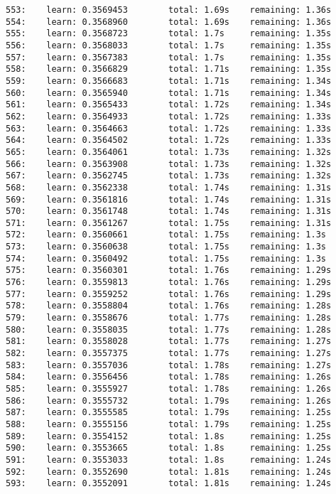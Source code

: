 \documentclass[11pt]{article}
\begin{document}
\begin{Verbatim}[commandchars=\\\{\}]
553:    learn: 0.3569453        total: 1.69s    remaining: 1.36s
554:    learn: 0.3568960        total: 1.69s    remaining: 1.36s
555:    learn: 0.3568723        total: 1.7s     remaining: 1.35s
556:    learn: 0.3568033        total: 1.7s     remaining: 1.35s
557:    learn: 0.3567383        total: 1.7s     remaining: 1.35s
558:    learn: 0.3566829        total: 1.71s    remaining: 1.35s
559:    learn: 0.3566683        total: 1.71s    remaining: 1.34s
560:    learn: 0.3565940        total: 1.71s    remaining: 1.34s
561:    learn: 0.3565433        total: 1.72s    remaining: 1.34s
562:    learn: 0.3564933        total: 1.72s    remaining: 1.33s
563:    learn: 0.3564663        total: 1.72s    remaining: 1.33s
564:    learn: 0.3564502        total: 1.72s    remaining: 1.33s
565:    learn: 0.3564061        total: 1.73s    remaining: 1.32s
566:    learn: 0.3563908        total: 1.73s    remaining: 1.32s
567:    learn: 0.3562745        total: 1.73s    remaining: 1.32s
568:    learn: 0.3562338        total: 1.74s    remaining: 1.31s
569:    learn: 0.3561816        total: 1.74s    remaining: 1.31s
570:    learn: 0.3561748        total: 1.74s    remaining: 1.31s
571:    learn: 0.3561267        total: 1.75s    remaining: 1.31s
572:    learn: 0.3560661        total: 1.75s    remaining: 1.3s
573:    learn: 0.3560638        total: 1.75s    remaining: 1.3s
574:    learn: 0.3560492        total: 1.75s    remaining: 1.3s
575:    learn: 0.3560301        total: 1.76s    remaining: 1.29s
576:    learn: 0.3559813        total: 1.76s    remaining: 1.29s
577:    learn: 0.3559252        total: 1.76s    remaining: 1.29s
578:    learn: 0.3558804        total: 1.76s    remaining: 1.28s
579:    learn: 0.3558676        total: 1.77s    remaining: 1.28s
580:    learn: 0.3558035        total: 1.77s    remaining: 1.28s
581:    learn: 0.3558028        total: 1.77s    remaining: 1.27s
582:    learn: 0.3557375        total: 1.77s    remaining: 1.27s
583:    learn: 0.3557036        total: 1.78s    remaining: 1.27s
584:    learn: 0.3556456        total: 1.78s    remaining: 1.26s
585:    learn: 0.3555927        total: 1.78s    remaining: 1.26s
586:    learn: 0.3555732        total: 1.79s    remaining: 1.26s
587:    learn: 0.3555585        total: 1.79s    remaining: 1.25s
588:    learn: 0.3555156        total: 1.79s    remaining: 1.25s
589:    learn: 0.3554152        total: 1.8s     remaining: 1.25s
590:    learn: 0.3553665        total: 1.8s     remaining: 1.25s
591:    learn: 0.3553033        total: 1.8s     remaining: 1.24s
592:    learn: 0.3552690        total: 1.81s    remaining: 1.24s
593:    learn: 0.3552091        total: 1.81s    remaining: 1.24s

\end{Verbatim}
\end{document}
